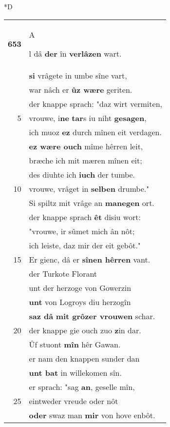 \documentclass[8pt,a4paper,notitlepage]{article}
\begin{document}
\begin{table}[ht]
\begin{minipage}[t]{0.5\linewidth}
\small
\begin{center}*D
\end{center}
\begin{tabular}{rl}
\textbf{653} & \begin{large}A\end{large}l dâ \textbf{der} în \textbf{verlâzen} wart.\\ 
 & \textbf{si} vrâgete in umbe sîne vart,\\ 
 & war nâch er \textbf{ûz wære} geriten.\\ 
 & der knappe sprach: "daz wirt vermiten,\\ 
5 & vrouwe, i\textbf{ne} \textbf{tar}s iu niht \textbf{gesagen},\\ 
 & ich muoz \textbf{ez} durch mînen eit verdagen.\\ 
 & \textbf{ez wære ouch} mîme hêrren leit,\\ 
 & bræche ich mit mæren mînen eit;\\ 
 & des diuhte ich \textbf{iuch} der tumbe.\\ 
10 & vrouwe, vrâget in \textbf{selben} drumbe."\\ 
 & Si spiltz mit vrâge an \textbf{manegen} ort.\\ 
 & der knappe sprach \textbf{êt} disiu wort:\\ 
 & "vrouwe, ir sûmet mich ân nôt;\\ 
 & ich leiste, daz mir der eit gebôt."\\ 
15 & Er gienc, dâ er \textbf{sînen hêrren} vant.\\ 
 & der Turkote Florant\\ 
 & unt der herzoge von Gowerzin\\ 
 & \textbf{unt} von Logroys diu herzogîn\\ 
 & \textbf{saz dâ} \textbf{mit grôzer vrouwen} schar.\\ 
20 & der knappe gie ouch zuo \textbf{z}in dar.\\ 
 & Ûf stuont \textbf{mîn} hêr Gawan.\\ 
 & er nam den knappen sunder dan\\ 
 & \textbf{unt bat} in willekomen sîn.\\ 
 & er sprach: "sag \textbf{an}, geselle mîn,\\ 
25 & eintweder vreude oder nôt\\ 
 & \textbf{oder} swaz man \textbf{mir} von hove enbôt.\\ 

\end{tabular}
\end{minipage}
\end{table}
\end{document}
